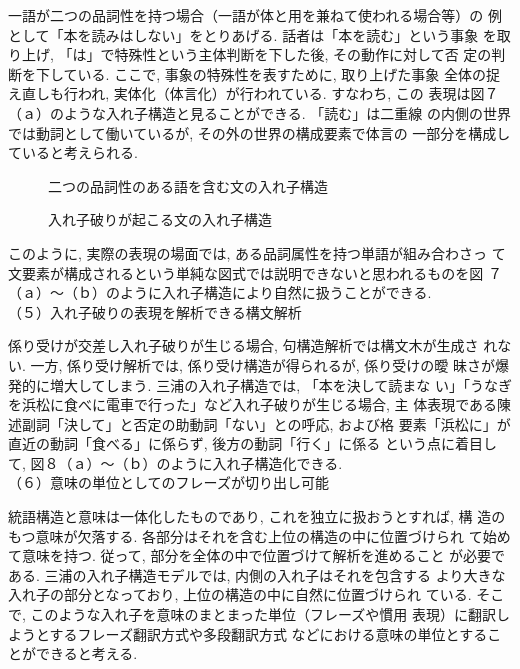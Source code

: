 一語が二つの品詞性を持つ場合（一語が体と用を兼ねて使われる場合等）の
例として「本を読みはしない」をとりあげる. 話者は「本を読む」という事象
を取り上げ, 「は」で特殊性という主体判断を下した後, その動作に対して否
定の判断を下している. ここで, 事象の特殊性を表すために, 取り上げた事象
全体の捉え直しも行われ, 実体化（体言化）が行われている. すなわち, この
表現は図７（ａ）のような入れ子構造と見ることができる. 「読む」は二重線
の内側の世界では動詞として働いているが, その外の世界の構成要素で体言の
一部分を構成していると考えられる.
\begin{figure}
\begin{center}
	
	
	
\end{center}
\caption{二つの品詞性のある語を含む文の入れ子構造}
\label{fig:futatsu}
\end{figure}
\begin{figure}
\begin{center}
	
	
	
\end{center}
\caption{入れ子破りが起こる文の入れ子構造}
\label{fig:yaburi}
\end{figure}

 このように, 実際の表現の場面では, ある品詞属性を持つ単語が組み合わさっ
て文要素が構成されるという単純な図式では説明できないと思われるものを図
７（ａ）〜（ｂ）のように入れ子構造により自然に扱うことができる. \\
（５）入れ子破りの表現を解析できる構文解析

係り受けが交差し入れ子破りが生じる場合, 句構造解析では構文木が生成さ
れない. 一方, 係り受け解析では, 係り受け構造が得られるが, 係り受けの曖
昧さが爆発的に増大してしまう. 三浦の入れ子構造では, 「本を決して読まな
い」「うなぎを浜松に食べに電車で行った」など入れ子破りが生じる場合, 主
体表現である陳述副詞「決して」と否定の助動詞「ない」との呼応, および格
要素「浜松に」が直近の動詞「食べる」に係らず, 後方の動詞「行く」に係る
という点に着目して, 図８（ａ）〜（ｂ）のように入れ子構造化できる. \\
（６）意味の単位としてのフレーズが切り出し可能

統語構造と意味は一体化したものであり, これを独立に扱おうとすれば, 構
造のもつ意味が欠落する. 各部分はそれを含む上位の構造の中に位置づけられ
て始めて意味を持つ. 従って, 部分を全体の中で位置づけて解析を進めること
が必要である. 三浦の入れ子構造モデルでは, 内側の入れ子はそれを包含する
より大きな入れ子の部分となっており, 上位の構造の中に自然に位置づけられ
ている. そこで, このような入れ子を意味のまとまった単位（フレーズや慣用
表現）に翻訳しようとするフレーズ翻訳方式や多段翻訳方式
\cite{Ikehara1987,Ikehara1992}
などにおける意味の単位とすることができると考える.

